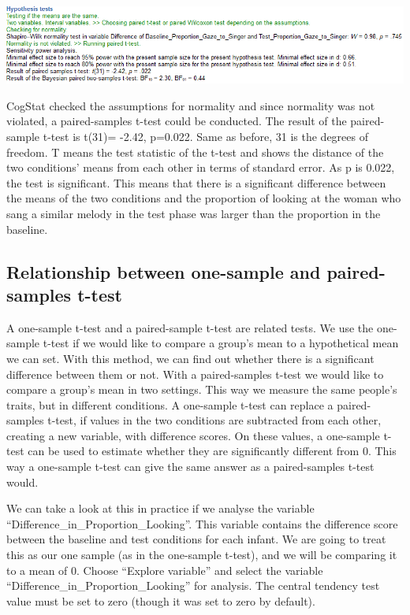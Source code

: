 \documentclass[
]{book}
\begin{document}
\includegraphics{img/ch6/6.7comparerepeatedmeasures_hyptest.png}

CogStat checked the assumptions for normality and since normality was not violated, a paired-samples t-test could be conducted. The result of the paired-sample t-test is t(31)= -2.42, p=0.022. Same as before, 31 is the degrees of freedom. T means the test statistic of the t-test and shows the distance of the two conditions' means from each other in terms of standard error. As p is 0.022, the test is significant. This means that there is a significant difference between the means of the two conditions and the proportion of looking at the woman who sang a similar melody in the test phase was larger than the proportion in the baseline.

\hypertarget{relationship-between-one-sample-and-paired-samples-t-test}{%
\subsection{Relationship between one-sample and paired-samples t-test}\label{relationship-between-one-sample-and-paired-samples-t-test}}

A one-sample t-test and a paired-sample t-test are related tests. We use the one-sample t-test if we would like to compare a group's mean to a hypothetical mean we can set. With this method, we can find out whether there is a significant difference between them or not. With a paired-samples t-test we would like to compare a group's mean in two settings. This way we measure the same people's traits, but in different conditions. A one-sample t-test can replace a paired-samples t-test, if values in the two conditions are subtracted from each other, creating a new variable, with difference scores. On these values, a one-sample t-test can be used to estimate whether they are significantly different from 0. This way a one-sample t-test can give the same answer as a paired-samples t-test would.

We can take a look at this in practice if we analyse the variable ``Difference\_in\_Proportion\_Looking''. This variable contains the difference score between the baseline and test conditions for each infant. We are going to treat this as our one sample (as in the one-sample t-test), and we will be comparing it to a mean of 0. Choose ``Explore variable'' and select the variable ``Difference\_in\_Proportion\_Looking'' for analysis. The central tendency test value must be set to zero (though it was set to zero by default).
\end{document}
